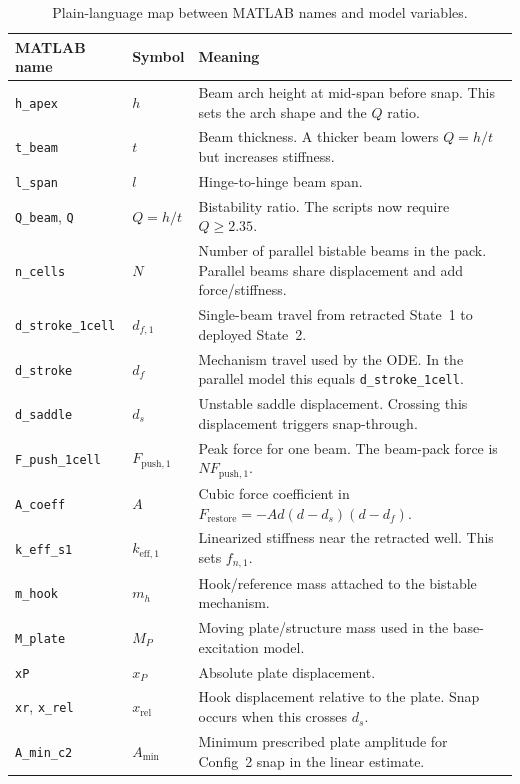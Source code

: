 \documentclass[11pt,letterpaper]{article}
\begin{document}
\begin{table}[H]
\centering
\caption{Plain-language map between MATLAB names and model variables.}
\renewcommand{\arraystretch}{1.25}
\begin{tabular}{p{3.1cm} p{3.1cm} p{7.2cm}}
\toprule
\textbf{MATLAB name} & \textbf{Symbol} & \textbf{Meaning} \\
\midrule
\texttt{h\_apex} & $h$ & Beam arch height at mid-span before snap. This sets the arch shape and the $Q$ ratio. \\
\texttt{t\_beam} & $t$ & Beam thickness. A thicker beam lowers $Q=h/t$ but increases stiffness. \\
\texttt{l\_span} & $l$ & Hinge-to-hinge beam span. \\
\texttt{Q\_beam}, \texttt{Q} & $Q=h/t$ & Bistability ratio. The scripts now require $Q\geq2.35$. \\
\texttt{n\_cells} & $N$ & Number of parallel bistable beams in the pack. Parallel beams share displacement and add force/stiffness. \\
\texttt{d\_stroke\_1cell} & $d_{f,1}$ & Single-beam travel from retracted State~1 to deployed State~2. \\
\texttt{d\_stroke} & $d_f$ & Mechanism travel used by the ODE. In the parallel model this equals \texttt{d\_stroke\_1cell}. \\
\texttt{d\_saddle} & $d_s$ & Unstable saddle displacement. Crossing this displacement triggers snap-through. \\
\texttt{F\_push\_1cell} & $F_{\mathrm{push},1}$ & Peak force for one beam. The beam-pack force is $N F_{\mathrm{push},1}$. \\
\texttt{A\_coeff} & $A$ & Cubic force coefficient in $F_{\mathrm{restore}}=-A d(d-d_s)(d-d_f)$. \\
\texttt{k\_eff\_s1} & $k_{\mathrm{eff},1}$ & Linearized stiffness near the retracted well. This sets $f_{n,1}$. \\
\texttt{m\_hook} & $m_h$ & Hook/reference mass attached to the bistable mechanism. \\
\texttt{M\_plate} & $M_P$ & Moving plate/structure mass used in the base-excitation model. \\
\texttt{xP} & $x_P$ & Absolute plate displacement. \\
\texttt{xr}, \texttt{x\_rel} & $x_{\mathrm{rel}}$ & Hook displacement relative to the plate. Snap occurs when this crosses $d_s$. \\
\texttt{A\_min\_c2} & $A_{\min}$ & Minimum prescribed plate amplitude for Config~2 snap in the linear estimate. \\
\bottomrule
\end{tabular}
\end{table}
\end{document}
